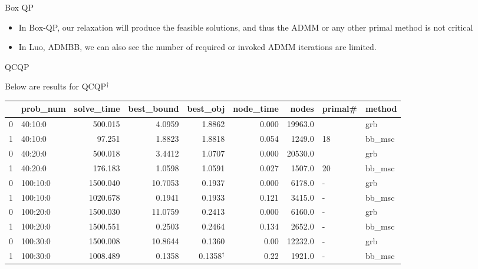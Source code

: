 \documentclass[aspectratio=1610, 9pt]{beamer}
\begin{document}
\begin{frame}[standout]{Box QP}
\begin{table}[h!]
    \begin{itemize}
      \item In Box-QP, our relaxation will produce the feasible solutions, and thus the ADMM or any other primal method is not critical
      \item In \textsf{Luo, ADMBB}, we can also see the number of required or invoked ADMM iterations are limited.
    \end{itemize}
  \end{table}
  \normalsize

\end{frame}

\begin{frame}[standout]{QCQP}

  Below are results for QCQP\(^\dagger\)

  \small
  \begin{table}[h!]
    \centering
    \begin{tabular}{llrrrrrll}
      \toprule
      {} & prob\_num & solve\_time & best\_bound & best\_obj          & node\_time & nodes   & primal\# & method  \\
      \midrule
      0  & 40:10:0   & 500.015     & 4.0959      & 1.8862             & 0.000      & 19963.0 &          & grb     \\
      1  & 40:10:0   & 97.251      & 1.8823      & 1.8818             & 0.054      & 1249.0  & 18       & bb\_msc \\
      0  & 40:20:0   & 500.018     & 3.4412      & 1.0707             & 0.000      & 20530.0 &          & grb     \\
      1  & 40:20:0   & 176.183     & 1.0598      & 1.0591             & 0.027      & 1507.0  & 20       & bb\_msc \\
      0  & 100:10:0  & 1500.040    & 10.7053     & 0.1937             & 0.000      & 6178.0  & -        & grb     \\
      1  & 100:10:0  & 1020.678    & 0.1941      & 0.1933             & 0.121      & 3415.0  & -        & bb\_msc \\
      0  & 100:20:0  & 1500.030    & 11.0759     & 0.2413             & 0.000      & 6160.0  & -        & grb     \\
      1  & 100:20:0  & 1500.551    & 0.2503      & 0.2464             & 0.134      & 2652.0  & -        & bb\_msc \\
      0  & 100:30:0  & 1500.008    & 10.8644     & 0.1360             & 0.00       & 12232.0 & -        & grb     \\
      1  & 100:30:0  & 1008.489    & 0.1358      & 0.1358\(^\dagger\) & 0.22       & 1921.0  & -        & bb\_msc \\

\end{tabular}
\end{table}
\end{frame}
\end{document}
